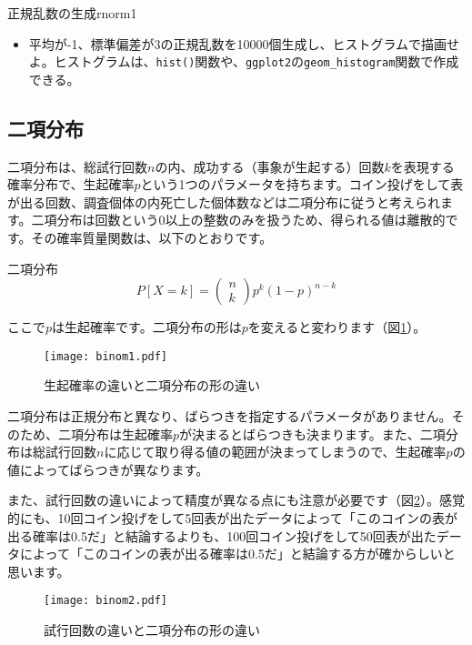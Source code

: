 \begin{exercise}{正規乱数の生成}{rnorm1}
\begin{itemize}
  \item 平均が-1、標準偏差が3の正規乱数を10000個生成し、ヒストグラムで描画せよ。ヒストグラムは、\verb|hist()|関数や、\verb|ggplot2|の\verb|geom_histogram|関数で作成できる。
\end{itemize}
\end{exercise}

\subsection{二項分布}
二項分布は、総試行回数$n$の内、成功する（事象が生起する）回数$k$を表現する確率分布で、生起確率$p$という1つのパラメータを持ちます。コイン投げをして表が出る回数、調査個体の内死亡した個体数などは二項分布に従うと考えられます。二項分布は回数という0以上の整数のみを扱うため、得られる値は離散的です。その確率質量関数は、以下のとおりです。
\begin{itembox}[l]{二項分布}
\begin{equation}
P[X=k] = \begin{pmatrix}
n \\
k
\end{pmatrix}
p^{k}(1-p)^{n-k}
\end{equation}
\end{itembox}
ここで$p$は生起確率です。二項分布の形は$p$を変えると変わります（図\ref{binom1}）。

\begin{figure}[htb]
\begin{center}
\graphicspath{{3_glm/figs/}}
\texttt{[image: binom1.pdf]}\\
\caption{生起確率の違いと二項分布の形の違い}
\label{binom1}
\end{center}
\end{figure}
二項分布は正規分布と異なり、ばらつきを指定するパラメータがありません。そのため、二項分布は生起確率$p$が決まるとばらつきも決まります。また、二項分布は総試行回数$n$に応じて取り得る値の範囲が決まってしまうので、生起確率$p$の値によってばらつきが異なります。

また、試行回数の違いによって精度が異なる点にも注意が必要です（図\ref{binom2}）。感覚的にも、10回コイン投げをして5回表が出たデータによって「このコインの表が出る確率は0.5だ」と結論するよりも、100回コイン投げをして50回表が出たデータによって「このコインの表が出る確率は0.5だ」と結論する方が確からしいと思います。
\begin{figure}[htb]
\begin{center}
\graphicspath{{3_glm/figs/}}
\texttt{[image: binom2.pdf]}\\
\caption{試行回数の違いと二項分布の形の違い}
\label{binom2}
\end{center}
\end{figure}

